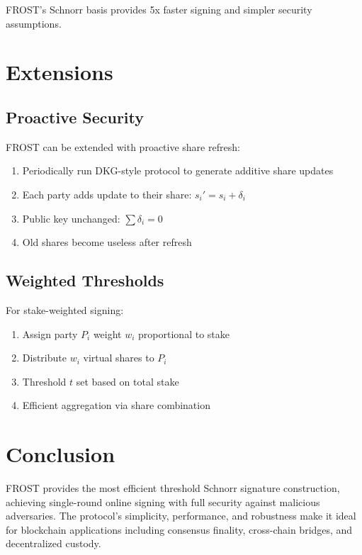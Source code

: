 \documentclass[11pt,a4paper]{article}
\begin{document}
FROST's Schnorr basis provides 5x faster signing and simpler security assumptions.

\section{Extensions}

\subsection{Proactive Security}

FROST can be extended with proactive share refresh:

\begin{enumerate}
    \item Periodically run DKG-style protocol to generate additive share updates
    \item Each party adds update to their share: $s_i' = s_i + \delta_i$
    \item Public key unchanged: $\sum \delta_i = 0$
    \item Old shares become useless after refresh
\end{enumerate}

\subsection{Weighted Thresholds}

For stake-weighted signing:

\begin{enumerate}
    \item Assign party $P_i$ weight $w_i$ proportional to stake
    \item Distribute $w_i$ virtual shares to $P_i$
    \item Threshold $t$ set based on total stake
    \item Efficient aggregation via share combination
\end{enumerate}

\section{Conclusion}

FROST provides the most efficient threshold Schnorr signature construction, achieving single-round online signing with full security against malicious adversaries. The protocol's simplicity, performance, and robustness make it ideal for blockchain applications including consensus finality, cross-chain bridges, and decentralized custody.
\end{document}
